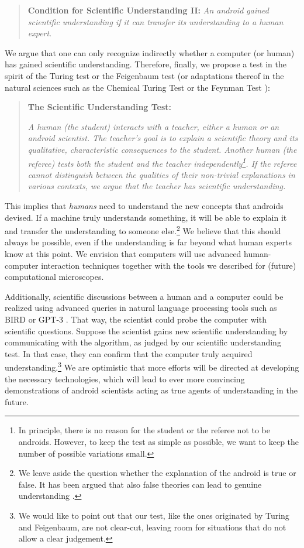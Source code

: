 \begin{quote}
\textbf{Condition for Scientific Understanding II:}
\textit{An android gained scientific understanding if it can transfer its understanding to a human expert}.
\end{quote}

We argue that one can only recognize indirectly whether a computer (or human) has gained scientific understanding. Therefore, finally, we propose a test in the spirit of the Turing test \cite{turing1950computing} or the Feigenbaum test\cite{feigenbaum2003some} (or adaptations thereof in the natural sciences such as the Chemical Turing Test or the Feynman Test \cite{aspuru2018matter}):

\begingroup

\begin{quote}
\textbf{The Scientific Understanding Test:}

\textit{A human (the student) interacts with a teacher, either a human or an android scientist. The teacher's goal is to explain a scientific theory and its qualitative, characteristic consequences to the student. Another human (the referee) tests both the student and the teacher independently\footnote{In principle, there is no reason for the student or the referee not to be androids. However, to keep the test as simple as possible, we want to keep the number of possible variations small.}. If the referee cannot distinguish between the qualities of their non-trivial explanations in various contexts, we argue that the teacher has scientific understanding.}
\end{quote}
\endgroup


This implies that \textit{humans} need to understand the new concepts that androids devised. If a machine truly understands something, it will be able to explain it and transfer the understanding to someone else.\footnote{We leave aside the question whether the explanation of the android is true or false. It has been argued that also false theories can lead to genuine understanding \cite{de2017false}.} We believe that this should always be possible, even if the understanding is far beyond what human experts know at this point. We envision that computers will use advanced human-computer interaction techniques together with the tools we described for (future) computational microscopes.

Additionally, scientific discussions between a human and a computer could be realized using advanced queries in natural language processing tools such as BIRD \cite{devlin2018bert} or GPT-3 \cite{brown2020language}. That way, the scientist could probe the computer with scientific questions. Suppose the scientist gains new scientific understanding by communicating with the algorithm, as judged by our scientific understanding test. In that case, they can confirm that the computer truly acquired understanding.\footnote{We would like to point out that our test, like the ones originated by Turing and Feigenbaum, are not clear-cut, leaving room for situations that do not allow a clear judgement.} We are optimistic that more efforts will be directed at developing the necessary technologies, which will lead to ever more convincing demonstrations of android scientists acting as true agents of understanding in the future. 


